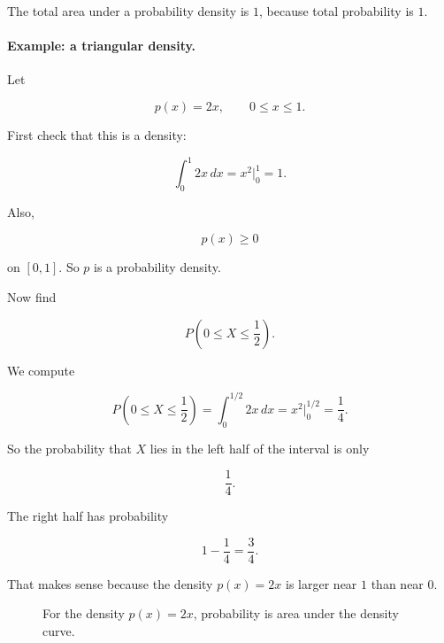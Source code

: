 The total area under a probability density is \(1\), because total probability is \(1\).

\paragraph{Example: a triangular density.}
Let

\[
p(x)=2x,
\qquad 0\le x\le1.
\]

First check that this is a density:

\[
\int_0^1 2x\,dx
=
x^2\Big|_0^1
=
1.
\]

Also,

\[
p(x)\ge0
\]

on \([0,1]\).  So \(p\) is a probability density.

Now find

\[
P\left(0\le X\le\frac12\right).
\]

We compute

\[
P\left(0\le X\le\frac12\right)
=
\int_0^{1/2}2x\,dx
=
x^2\Big|_0^{1/2}
=
\frac14.
\]

So the probability that \(X\) lies in the left half of the interval is only

\[
\boxed{\frac14}.
\]

The right half has probability

\[
1-\frac14=\frac34.
\]

That makes sense because the density \(p(x)=2x\) is larger near \(1\) than near \(0\).

\begin{figure}[h]
\centering
{}
\caption{For the density \(p(x)=2x\), probability is area under the density curve.}
\label{fig:triangular-density}
\end{figure}

